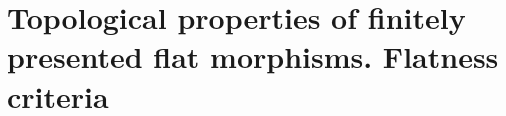 \section{Topological properties of finitely presented flat morphisms. Flatness criteria}
\label{section:IV.11}

